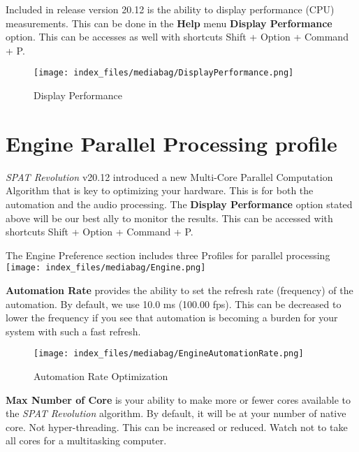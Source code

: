 \documentclass[
  letterpaper,
  DIV=11,
  numbers=noendperiod]{scrreport}
\begin{document}
Included in release version 20.12 is the ability to display performance
(CPU) measurements. This can be done in the \textbf{Help} menu
\textbf{Display Performance} option. This can be accesses as well with
shortcuts Shift + Option + Command + P.

\begin{figure}

{\centering \texttt{[image: index\_files/mediabag/DisplayPerformance.png]}

}

\caption{Display Performance}

\end{figure}

\hypertarget{engine-parallel-processing-profile}{%
\section{Engine Parallel Processing
profile}\label{engine-parallel-processing-profile}}

\emph{SPAT Revolution} v20.12 introduced a new Multi-Core Parallel
Computation Algorithm that is key to optimizing your hardware. This is
for both the automation and the audio processing. The \textbf{Display
Performance} option stated above will be our best ally to monitor the
results. This can be accessed with shortcuts Shift + Option + Command +
P.

The Engine Preference section includes three Profiles for parallel
processing \texttt{[image: index\_files/mediabag/Engine.png]}

\textbf{Automation Rate} provides the ability to set the refresh rate
(frequency) of the automation. By default, we use 10.0 ms (100.00 fps).
This can be decreased to lower the frequency if you see that automation
is becoming a burden for your system with such a fast refresh.

\begin{figure}

{\centering \texttt{[image: index\_files/mediabag/EngineAutomationRate.png]}

}

\caption{Automation Rate Optimization}

\end{figure}

\textbf{Max Number of Core} is your ability to make more or fewer cores
available to the \emph{SPAT Revolution} algorithm. By default, it will
be at your number of native core. Not hyper-threading. This can be
increased or reduced. Watch not to take all cores for a multitasking
computer.
\end{document}
